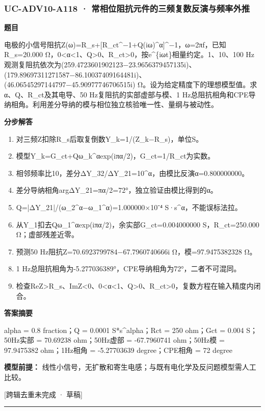 \documentclass[UTF8,11pt,a4paper]{ctexart}
\begin{document}
\subsubsection*{UC-ADV10-A118 · 常相位阻抗元件的三频复数反演与频率外推}
\noindent\textbf{题目}\par
电极的小信号阻抗Z(ω)=R\_s+[R\_ct\textasciicircum{}−1+Q(iω)\textasciicircum{}α]\textasciicircum{}−1，ω=2πf，已知R\_s=20.000 Ω，0<α<1、Q>0、R\_ct>0，按e\textasciicircum{}\{iωt\}相量约定。1、10、100 Hz观测复阻抗依次为(259.4723601902123−23.9656379457135i)、(179.89697311271587−86.10037409164481i)、(46.06545297144797−45.90977746706515i) Ω。设为给定精度下的理想模型值。求α、Q、R\_ct及其电导、50 Hz复阻抗的实部虚部与模、1 Hz总阻抗相角和CPE导纳相角。利用差分导纳的模与相位独立核验唯一性、量纲与被动性。\par
\medskip\noindent\textbf{分步解答}
\begin{enumerate}
\item 对三频Z扣除R\_s后取复倒数Y\_k=1/(Z\_k−R\_s)，单位S。
\item 模型Y\_k=G\_ct+Qω\_k\textasciicircum{}αexp(iπα/2)，G\_ct=1/R\_ct为实数。
\item 相邻频率比10，差分ΔY\_32/ΔY\_21=10\textasciicircum{}α，由模比反演α=0.800000000。
\item 差分导纳相角argΔY\_21=πα/2=72°，独立验证由模比得到的α。
\item Q=|ΔY\_21|/(ω\_2\textasciicircum{}α−ω\_1\textasciicircum{}α)=1.000000×10⁻⁴ S·s\textasciicircum{}α，不能误标法拉。
\item 从Y\_1扣去Qω\_1\textasciicircum{}αexp(iπα/2)，余实部G\_ct=0.004000000 S，R\_ct=250.000 Ω；虚部残差近零。
\item 预测50 Hz阻抗Z=70.6923799784−67.7960740666i Ω，模=97.9475382328 Ω。
\item 1 Hz总阻抗相角为-5.277036389°，CPE导纳相角为72°，二者不可混同。
\item 检查ReZ>R\_s、ImZ<0、0<α<1、Q>0、R\_ct>0，复数方程在输入精度内闭合。
\end{enumerate}
\noindent\textbf{答案摘要}\par
alpha = 0.8 fraction；Q = 0.0001 S*s\textasciicircum{}alpha；Rct = 250 ohm；Gct = 0.004 S；50Hz实部 = 70.69238 ohm；50Hz虚部 = -67.7960741 ohm；50Hz模 = 97.9475382 ohm；1Hz相角 = -5.27703639 degree；CPE相角 = 72 degree\par
\noindent\textbf{模型前提：}
线性小信号，无扩散和寄生电感；与既有电化学及反问题模型需人工比较。\par
\noindent\textcolor{red!65!black}{[跨辑去重未完成 · 草稿]} \par
\medskip\hrule\medskip
{}
\end{document}
